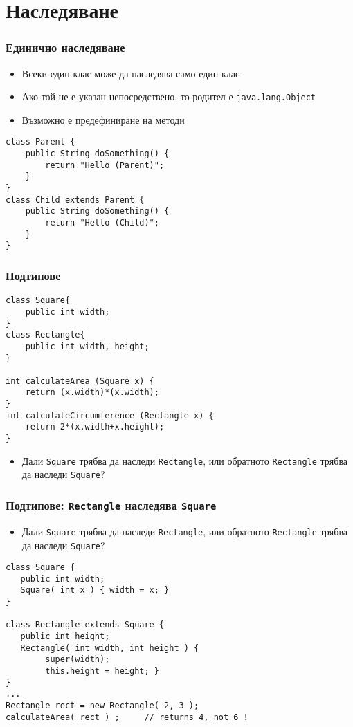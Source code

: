 \documentclass[ignorenonframetext, hyperref=unicode,compress,pdflatex]{beamer}
\begin{document}
\section{Наследяване}

\begin{frame}[containsverbatim]\frametitle{Единично наследяване}
\begin{itemize}
\item Всеки един клас може да наследява само един клас
\item Ако той не е указан непосредствено, то родител е \lstinline{java.lang.Object}
\item Възможно е предефиниране на методи
\end{itemize}
\begin{lstlisting}
class Parent { 
 	public String doSomething() {
 		return "Hello (Parent)";
	}
}
class Child extends Parent { 
 	public String doSomething() {
 		return "Hello (Child)";
	}
}
\end{lstlisting}
\end{frame}

\begin{frame}[containsverbatim]\frametitle{Подтипове}
\begin{lstlisting}
class Square{ 
	public int width;
}
class Rectangle{ 
	public int width, height;
}

int calculateArea (Square x) {
    return (x.width)*(x.width); 
}
int calculateCircumference (Rectangle x) {
    return 2*(x.width+x.height); 
}
\end{lstlisting}
\begin{itemize}
\item Дали \lstinline{Square} трябва да наследи \lstinline{Rectangle}, или обратното \lstinline{Rectangle} трябва да наследи \lstinline{Square}?
\end{itemize}
\end{frame}

\begin{frame}[containsverbatim]\frametitle{Подтипове: \lstinline{Rectangle} наследява \lstinline{Square}}
\begin{itemize}
\item Дали \lstinline{Square} трябва да наследи \lstinline{Rectangle}, или обратното \lstinline{Rectangle} трябва да наследи \lstinline{Square}?
\end{itemize}
\begin{lstlisting}
class Square {
   public int width;
   Square( int x ) { width = x; }
}

class Rectangle extends Square {
   public int height;
   Rectangle( int width, int height ) {
        super(width);
        this.height = height; }
}
...
Rectangle rect = new Rectangle( 2, 3 );
calculateArea( rect ) ;     // returns 4, not 6 !
\end{lstlisting}
\end{frame}
\end{document}
